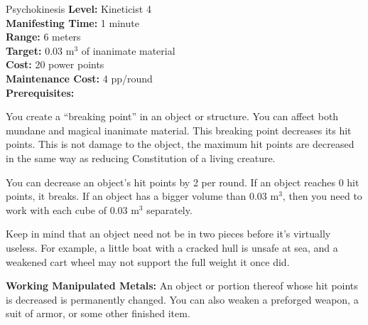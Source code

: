 {Psychokinesis}
{
	\textbf{Level:}
	Kineticist 4\\
	\textbf{Manifesting Time:}
	1 minute\\
	\textbf{Range:}
	6 meters\\
	\textbf{Target:}
	0.03 m$^3$ of inanimate material\\
	\textbf{Cost:}
	20 power points\\
	\textbf{Maintenance Cost:}
	4 pp/round\\
	\textbf{Prerequisites:}
	\\
}
{
	You create a ``breaking point'' in an object or structure. You can affect both mundane and magical inanimate material. This breaking point decreases its hit points. This is not damage to the object, the maximum hit points are decreased in the same way as reducing Constitution of a living creature.

	You can decrease an object's hit points by 2 per round. If an object reaches 0 hit points, it breaks. If an object has a bigger volume than 0.03 m$^3$, then you need to work with each cube of 0.03 m$^3$ separately.

	Keep in mind that an object need not be in two pieces before it's virtually useless. For example, a little boat with a cracked hull is unsafe at sea, and a weakened cart wheel may not support the full weight it once did.

	\textbf{Working Manipulated Metals:} An object or portion thereof whose hit points is decreased is permanently changed. You can also weaken a preforged weapon, a suit of armor, or some other finished item.
}